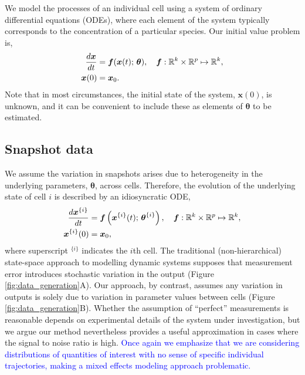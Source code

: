 We model the processes of an individual cell using a system of ordinary differential equations (ODEs), where each element of the system typically corresponds to the concentration of a particular species. Our initial value problem is,
%
\begin{equation}\label{eq:ode}
\begin{aligned}
\frac{d\boldsymbol{x}}{dt} &= \boldsymbol{f}(\boldsymbol{x}(t); \, \boldsymbol{\theta}), \quad \boldsymbol{f}: \mathbb{R}^k \times \mathbb{R}^p \mapsto \mathbb{R}^k, \\
\boldsymbol{x}(0) &= \boldsymbol{x}_0.
\end{aligned}
\end{equation}
%
Note that in most circumstances, the initial state of the system, $\boldsymbol{x}(0)$, is unknown, and it can be convenient to include these as elements of $\boldsymbol{\theta}$ to be estimated.

\subsection{Snapshot data}
We assume the variation in snapshots arises due to heterogeneity in the underlying parameters, $\boldsymbol{\theta}$, across cells. Therefore, the evolution of the underlying state of cell $i$ is described by an idiosyncratic ODE,
%
\begin{equation} \label{eq:ode_i}
\begin{aligned}
\frac{d\boldsymbol{x}^{\{i\}}}{dt} &= \boldsymbol{f} \left( \boldsymbol{x}^{\{i\}}(t); \, \boldsymbol{\theta}^{\{i\}} \right),
                                      \quad \boldsymbol{f}: \mathbb{R}^k \times \mathbb{R}^p \mapsto \mathbb{R}^k, \\
\boldsymbol{x}^{\{i\}}(0) &= \boldsymbol{x}_0,
\end{aligned}
\end{equation}
where superscript $^{\{i\}}$ indicates the $i$th cell.
%
The traditional (non-hierarchical) state-space approach to modelling dynamic systems supposes that measurement error introduces stochastic variation in the output (Figure \ref{fig:data_generation}A). Our approach, by contrast, assumes any variation in outputs is solely due to variation in parameter values between cells (Figure \ref{fig:data_generation}B). Whether the assumption of ``perfect'' measurements is reasonable depends on experimental details of the system under investigation, but we argue our method nevertheless provides a useful approximation in cases where the signal to noise ratio is high. \textcolor{blue}{Once again we emphasize that we are considering distributions of quantities of interest with no sense of specific individual trajectories, making a mixed effects modeling approach problematic.}

